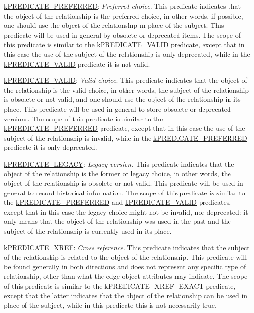 \begin{DoxyItemize}
\item {\ttfamily \hyperlink{}{k\-P\-R\-E\-D\-I\-C\-A\-T\-E\-\_\-\-P\-R\-E\-F\-E\-R\-R\-E\-D}}\-: {\itshape Preferred choice}. This predicate indicates that the object of the relationship is the preferred choice, in other words, if possible, one should use the object of the relationship in place of the subject. This predicate will be used in general by obsolete or deprecated items. The scope of this predicate is similar to the \hyperlink{}{k\-P\-R\-E\-D\-I\-C\-A\-T\-E\-\_\-\-V\-A\-L\-I\-D} predicate, except that in this case the use of the subject of the relationship is only deprecated, while in the \hyperlink{}{k\-P\-R\-E\-D\-I\-C\-A\-T\-E\-\_\-\-V\-A\-L\-I\-D} predicate it is not valid. 
\item {\ttfamily \hyperlink{}{k\-P\-R\-E\-D\-I\-C\-A\-T\-E\-\_\-\-V\-A\-L\-I\-D}}\-: {\itshape Valid choice}. This predicate indicates that the object of the relationship is the valid choice, in other words, the subject of the relationship is obsolete or not valid, and one should use the object of the relationship in its place. This predicate will be used in general to store obsolete or deprecated versions. The scope of this predicate is similar to the \hyperlink{}{k\-P\-R\-E\-D\-I\-C\-A\-T\-E\-\_\-\-P\-R\-E\-F\-E\-R\-R\-E\-D} predicate, except that in this case the use of the subject of the relationship is invalid, while in the \hyperlink{}{k\-P\-R\-E\-D\-I\-C\-A\-T\-E\-\_\-\-P\-R\-E\-F\-E\-R\-R\-E\-D} predicate it is only deprecated. 
\item {\ttfamily \hyperlink{}{k\-P\-R\-E\-D\-I\-C\-A\-T\-E\-\_\-\-L\-E\-G\-A\-C\-Y}}\-: {\itshape Legacy version}. This predicate indicates that the object of the relationship is the former or legacy choice, in other words, the object of the relationship is obsolete or not valid. This predicate will be used in general to record historical information. The scope of this predicate is similar to the \hyperlink{}{k\-P\-R\-E\-D\-I\-C\-A\-T\-E\-\_\-\-P\-R\-E\-F\-E\-R\-R\-E\-D} and \hyperlink{}{k\-P\-R\-E\-D\-I\-C\-A\-T\-E\-\_\-\-V\-A\-L\-I\-D} predicates, except that in this case the legacy choice might not be invalid, nor deprecated\-: it only means that the object of the relationship was used in the past and the subject of the relationship is currently used in its place. 
\item {\ttfamily \hyperlink{}{k\-P\-R\-E\-D\-I\-C\-A\-T\-E\-\_\-\-X\-R\-E\-F}}\-: {\itshape Cross reference}. This predicate indicates that the subject of the relationship is related to the object of the relationship. This predicate will be found generally in both directions and does not represent any specific type of relationship, other than what the edge object attributes may indicate. The scope of this predicate is similar to the \hyperlink{}{k\-P\-R\-E\-D\-I\-C\-A\-T\-E\-\_\-\-X\-R\-E\-F\-\_\-\-E\-X\-A\-C\-T} predicate, except that the latter indicates that the object of the relationship can be used in place of the subject, while in this predicate this is not necessarily true. 

\end{DoxyItemize}

